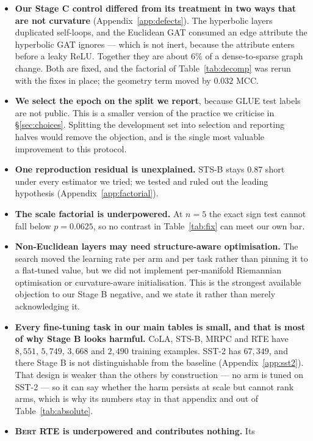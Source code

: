 \documentclass{article}
\begin{document}
\begin{itemize}
      revision.
\item \textbf{Our Stage C control differed from its treatment in two ways that
      are not curvature} (Appendix~\ref{app:defects}). The hyperbolic layers
      duplicated self-loops, and the Euclidean GAT consumed an edge attribute
      the hyperbolic GAT ignores --- which is not inert, because the attribute
      enters before a leaky ReLU. Together they are about $6\%$ of a
      dense-to-sparse graph change. Both are fixed, and the factorial of
      Table~\ref{tab:decomp} was rerun with the fixes in place; the geometry
      term moved by $0.032$ MCC.
\item \textbf{We select the epoch on the split we report}, because GLUE test
      labels are not public. This is a smaller version of the practice we
      criticise in \S\ref{sec:choices}. Splitting the development set into
      selection and reporting halves would remove the objection, and is the
      single most valuable improvement to this protocol.
\item \textbf{One reproduction residual is unexplained.} STS-B stays $0.87$
      short under every estimator we tried; we tested and ruled out the leading
      hypothesis (Appendix~\ref{app:factorial}).
\item \textbf{The scale factorial is underpowered.} At $n=5$ the exact sign test
      cannot fall below $p = 0.0625$, so no contrast in Table~\ref{tab:fix} can
      meet our own bar.
\item \textbf{Non-Euclidean layers may need structure-aware optimisation.} The
      search moved the learning rate per arm and per task rather than pinning it
      to a flat-tuned value, but we did not implement per-manifold Riemannian
      optimisation or curvature-aware initialisation. This is the strongest
      available objection to our Stage B negative, and we state it rather than
      merely acknowledging it.
\item \textbf{Every fine-tuning task in our main tables is small, and that is
      most of why Stage B looks harmful.} CoLA, STS-B, MRPC and RTE have
      $8{,}551$, $5{,}749$, $3{,}668$ and $2{,}490$ training examples. SST-2 has
      $67{,}349$, and there Stage B is not distinguishable from the baseline
      (Appendix~\ref{app:sst2}). That design is weaker than the others by
      construction --- no arm is tuned on SST-2 --- so it can say whether the
      harm persists at scale but cannot rank arms, which is why its numbers stay
      in that appendix and out of Table~\ref{tab:absolute}.
\item \textbf{\textsc{Bert} RTE is underpowered and contributes nothing.} Its

\end{itemize}
\end{document}
